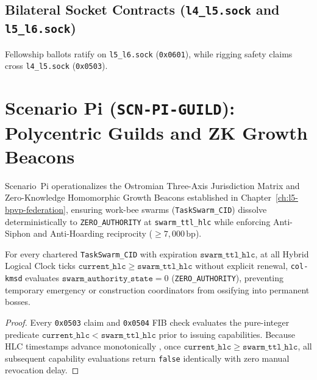 \subsection{Bilateral Socket Contracts (\texttt{l4\_l5.sock} and \texttt{l5\_l6.sock})}

Fellowship ballots ratify on \texttt{l5\_l6.sock} (\texttt{0x0601}), while rigging safety claims
cross \texttt{l4\_l5.sock} (\texttt{0x0503}).

\section{Scenario Pi (\texttt{SCN-PI-GUILD}): Polycentric Guilds and ZK Growth Beacons}
\label{sec:wavee-pi}

Scenario~Pi operationalizes the Ostromian Three-Axis Jurisdiction Matrix and Zero-Knowledge
Homomorphic Growth Beacons established in Chapter~\ref{ch:l5-bpvp-federation}, ensuring work-bee
swarms (\texttt{TaskSwarm\_CID}) dissolve deterministically to \texttt{ZERO\_AUTHORITY} at
\texttt{swarm\_ttl\_hlc} while enforcing Anti-Siphon and Anti-Hoarding reciprocity ($\ge 7{,}000\,\mathrm{bp}$).

\begin{theorem}
\label{thm:wavee-pi-swarm}
For every chartered \texttt{TaskSwarm\_CID} with expiration $\mathtt{swarm\_ttl\_hlc}$, at all
Hybrid Logical Clock ticks $\mathtt{current\_hlc} \ge \mathtt{swarm\_ttl\_hlc}$ without explicit
renewal, \texttt{col-kmsd} evaluates $\mathtt{swarm\_authority\_state} = 0$ (\texttt{ZERO\_AUTHORITY}),
preventing temporary emergency or construction coordinators from ossifying into permanent bosses.
\end{theorem}
\begin{proof}
Every \texttt{0x0503} claim and \texttt{0x0504} FIB check evaluates the pure-integer predicate
$\mathtt{current\_hlc} < \mathtt{swarm\_ttl\_hlc}$ prior to issuing capabilities. Because HLC
timestamps advance monotonically \parencite{kulkarni2014logical}, once $\mathtt{current\_hlc} \ge \mathtt{swarm\_ttl\_hlc}$,
all subsequent capability evaluations return \texttt{false} identically with zero manual revocation delay.
\end{proof}

